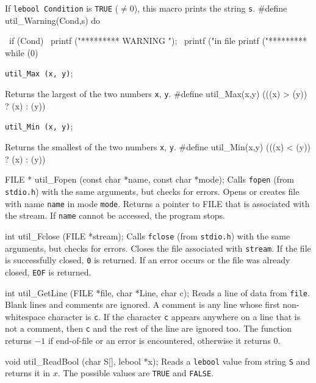  \tab  If {\tt lebool Condition} is {\tt TRUE} ($\not = 0$),
 this macro prints the string {\tt s}.
 \endtab
\code
\hide
#define util_Warning(Cond,s) do { \
   if (Cond) { \
      printf ("*********  WARNING "); \
      printf ("in file  %
      printf ("*********  %
   } while (0)
\endhide
\endcode

\noindent 
{\tt util\_Max (x, y)};

 \tab  Returns the largest of the two numbers {\tt  x}, {\tt y}.
 \endtab
\code
\hide
#define util_Max(x,y) (((x) > (y)) ? (x) : (y))
\endhide
\endcode

\noindent 
{\tt util\_Min (x, y)};

 \tab  Returns the smallest of the two numbers {\tt  x}, {\tt y}.
 \endtab
\code
\hide
#define util_Min(x,y) (((x) < (y)) ? (x) : (y))
\endhide
\endcode



\code

FILE * util_Fopen (const char *name, const char *mode);
\endcode
  \tab 
  Calls {\tt fopen} (from {\tt stdio.h}) with the same arguments, but checks for errors.
  Opens or creates file with name {\tt name} in mode {\tt mode}. Returns a pointer to 
  FILE that is associated with the stream. If {\tt name} cannot be accessed, the program
  stops. 
 \endtab
\code

int util_Fclose (FILE *stream);
\endcode
  \tab 
   Calls {\tt fclose} (from {\tt stdio.h}) with the same arguments, but checks for errors.
   Closes the file associated with {\tt stream}. If the file is successfully 
   closed, {\tt 0}
   is returned. If an error occurs or the file was already closed, {\tt EOF} is returned.
 \endtab
\code

int util_GetLine (FILE *file, char *Line, char c);
\endcode
  \tab
  Reads a line of data from {\tt file}. Blank lines and comments are
  ignored. A comment is any line whose first non-whitespace character
  is {\tt c}. If the character {\tt c} appears anywhere on a line that is
  not a comment, then  {\tt c} and the rest of the line are ignored too. 
  The function returns $-1$ if end-of-file or an error is encountered,
  otherwise it returns 0.
  \endtab
\code

void util_ReadBool (char S[], lebool *x);
\endcode
  \tab
  Reads a {\tt lebool} value from string {\tt S} and returns it in  $x$.
  The possible values are  {\tt TRUE} and  {\tt FALSE}.
  \endtab
\code

}
